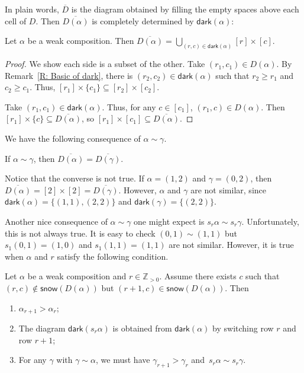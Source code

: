 \documentclass[ALCO]{cedram}
\newcommand{\Z}{\mathbb{Z}}
\newcommand{\dark}{\mathsf{dark}}
\newcommand{\snow}{\mathsf{snow}}
\begin{document}
In plain words, $\overline{D}$ is the diagram obtained
by filling the empty spaces above each cell of $D$.
Then $\overline{D(\alpha)}$ is completely determined 
by $\dark(\alpha)$:
\begin{lemma}
Let $\alpha$ be a weak composition.
Then $\overline{D(\alpha)} = \bigcup_{(r,c) \in \dark(\alpha)} [r] \times [c]$.
\end{lemma}
\begin{proof}
We show each side is a subset of the other. 
Take $(r_1,c_1) \in D(\alpha)$. 
By Remark~\ref{R: Basic of dark},
there is $(r_2, c_2) \in \dark(\alpha)$ such that 
$r_2 \geqslant r_1$ and $c_2 \geqslant c_1$.
Thus, $[r_1] \times \{c_1\} \subseteq [r_2] \times [c_2]$.

Take $(r_1,c_1) \in \dark(\alpha)$.
Thus, for any $c \in [c_1]$, 
$(r_1,c) \in D(\alpha)$.
Then $[r_1] \times \{c\} \subseteq \overline{D(\alpha)}$,
so $[r_1] \times [c_1] \subseteq \overline{D(\alpha)}$. 
\end{proof}

We have the following consequence of 
$\alpha \sim \gamma$.

\begin{cor}
\label{C: sim implies same overline}
If $\alpha \sim \gamma$,
then $\overline{D(\alpha)} = \overline{D(\gamma)}$.
\end{cor}
Notice that the converse is not true. 
If $\alpha = (1,2)$ and $\gamma = (0,2)$,
then $\overline{D(\alpha)} = [2] \times [2]
=  \overline{D(\gamma)}$.
However, $\alpha$ and $\gamma$ are not similar,
since $\dark(\alpha) = \{ (1,1), (2,2)\}$
and $\dark(\gamma) = \{(2,2)\}$.

Another nice consequence of $\alpha \sim \gamma$ one might expect
is $s_r \alpha \sim s_r \gamma$.
Unfortunately, this is not always true. 
It is easy to check $(0,1) \sim (1,1)$
but $s_1(0,1) = (1,0)$  and $s_1(1,1) = (1,1)$ are not similar. 
However, it is true
when $\alpha$ and $r$ satisfy 
the following condition.

\begin{lemma}
\label{L: s_i fix sim}
Let $\alpha$ be a weak composition and $r\in \Z_{>0}$.
Assume there exists $c$
such that $(r, c)\notin \snow(D(\alpha))$
but $(r+1, c)\in \snow(D(\alpha))$.
Then 
\begin{enumerate}
\item[(i)] $\alpha_{r+1} > \alpha_r$;
\item[(ii)] The diagram $\dark(s_r \alpha)$
is obtained from $\dark(\alpha)$
by switching row $r$ and row $r+1$;
\item[(iii)] For any $\gamma$ with
$\gamma \sim \alpha$,
we must have $\gamma_{r+1} > \gamma_{r}$ 
and~$s_r\alpha \sim s_r\gamma$.
\end{enumerate}
\end{lemma}
\end{document}
